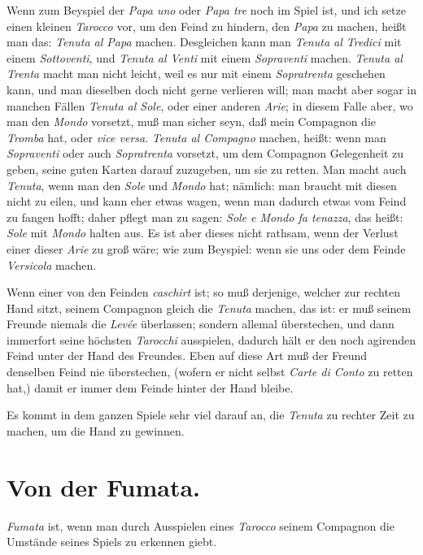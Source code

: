 \documentclass[11pt,a6paper,twoside]{article}
\begin{document}
Wenn zum Beyspiel der \textit{Papa uno} oder \textit{Papa tre} noch im Spiel ist, und ich setze einen kleinen \textit{Tarocco} vor, um den Feind zu hindern, den \textit{Papa} zu machen, heißt man das: \textit{Tenuta al Papa} machen. Desgleichen kann man \textit{Tenuta al Tredici} mit einem \textit{Sottoventi}, und \textit{Tenuta al Venti} mit einem \textit{Sopraventi} machen. \textit{Tenuta al Trenta} macht man nicht leicht, weil es nur mit einem \textit{Sopratrenta} geschehen kann, und man dieselben doch nicht gerne verlieren will; man macht aber sogar in manchen Fällen \textit{Tenuta al Sole}, oder einer anderen \textit{Arie}; in diesem Falle aber, wo man den \textit{Mondo} vorsetzt, muß man sicher seyn, daß mein Compagnon die \textit{Tromba} hat, oder \textit{vice versa}. \textit{Tenuta al Compagno} machen, heißt: wenn man \textit{Sopraventi} oder auch \textit{Sopratrenta} vorsetzt, um dem Compagnon Gelegenheit zu geben, seine guten Karten darauf zuzugeben, um sie zu retten. Man macht auch \textit{Tenuta}, wenn man den \textit{Sole} und \textit{Mondo} hat; nämlich: man braucht mit diesen nicht zu eilen, und kann eher etwas wagen, wenn man dadurch etwas vom Feind zu fangen hofft; daher pflegt man zu sagen: \textit{Sole e Mondo fa tenazza}, das heißt: \textit{Sole} mit \textit{Mondo} halten aus. Es ist aber dieses nicht rathsam, wenn der Verlust einer dieser \textit{Arie} zu groß wäre; wie zum Beyspiel: wenn sie uns oder dem Feinde \textit{Versicola} machen.

Wenn einer von den Feinden \textit{caschirt} ist; so muß derjenige, welcher zur rechten Hand sitzt, seinem Compagnon gleich die \textit{Tenuta} machen, das ist: er muß seinem Freunde niemals die \textit{Levée} überlassen; sondern allemal überstechen, und dann immerfort seine höchsten \textit{Tarocchi} ausspielen, dadurch hält er den noch agirenden Feind unter der Hand des Freundes. Eben auf diese Art muß der Freund denselben Feind nie überstechen, (wofern er nicht selbst \textit{Carte di Conto} zu retten hat,) damit er immer dem Feinde hinter der Hand bleibe.

Es kommt in dem ganzen Spiele sehr viel darauf an, die \textit{Tenuta} zu rechter Zeit zu machen, um die Hand zu gewinnen.


\section{Von der Fumata.}

\textit{Fumata} ist, wenn man durch Ausspielen eines \textit{Tarocco} seinem Compagnon die Umstände seines Spiels zu erkennen giebt.
\end{document}
